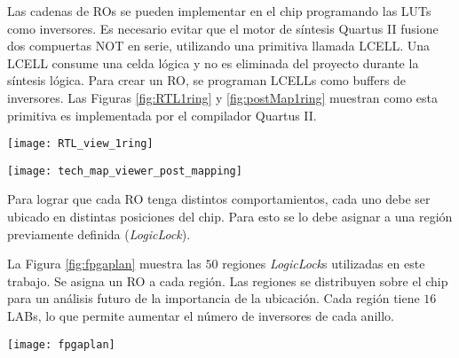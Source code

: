 Las cadenas de {RO}s se pueden implementar en el chip programando las {LUT}s como inversores.
Es necesario evitar que el motor de síntesis {Quartus} II fusione dos compuertas {NOT} en serie, utilizando una primitiva llamada {LCELL}.
Una {LCELL} consume una celda lógica y no es eliminada del proyecto durante la síntesis lógica.
Para crear un {RO}, se programan {LCELL}s como buffers de inversores.
Las Figuras \ref{fig:RTL1ring} y \ref{fig:postMap1ring} muestran como esta primitiva es implementada por el compilador Quartus II.
%
\begin{figure*}
\begin{center}
\texttt{[image: RTL\_view\_1ring]}
\caption{Vista RTL de un ring con $3$ inversores.}
\label{fig:RTL1ring}
\end{center}
\end{figure*}
%
\begin{figure*}
\begin{center}
\texttt{[image: tech\_map\_viewer\_post\_mapping]}
\caption{\textit{Technology map viewer} (post mapeo) de un ring con $3$ inversores.} \label{fig:postMap1ring}
\end{center}
\end{figure*}

Para lograr que cada {RO} tenga distintos comportamientos, cada uno debe ser ubicado en distintas posiciones del chip.
Para esto se lo debe asignar a una región previamente definida (\textit{LogicLock}).

La Figura \ref{fig:fpgaplan} muestra las $50$ regiones \emph{LogicLock}s utilizadas en este trabajo.
Se asigna un {RO} a cada región.
Las regiones se distribuyen sobre el chip para un análisis futuro de la importancia de la ubicación.
Cada región tiene $16$ {LAB}s, lo que permite aumentar el número de inversores de cada anillo.
%
\begin{figure*}
\begin{center}
\texttt{[image: fpgaplan]}
\caption{Vista de las regiones \emph{LogicLock} del \emph{Chip Planner}.}
\label{fig:fpgaplan}
\end{center}
\end{figure*}

